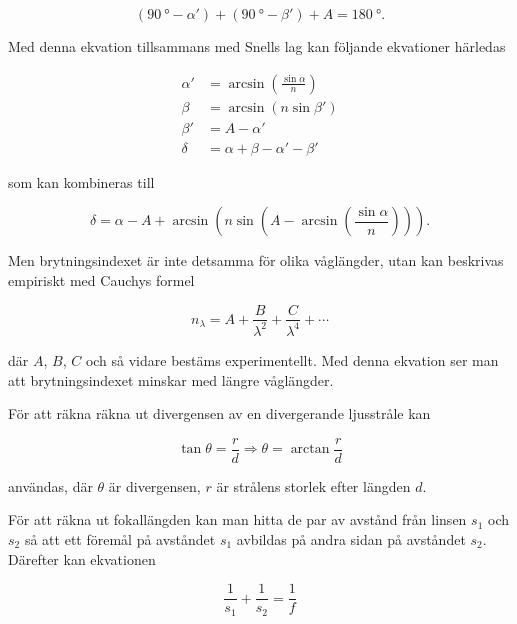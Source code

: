 \documentclass[a4paper]{article}
\begin{document}
  \begin{equation} \label{eq:triSum}
  	(\SI{90}{\degree} - \alpha') + (\SI{90}{\degree} - \beta') + A = \SI{180}{\degree}\text{.}
  \end{equation}
  
  Med denna ekvation tillsammans med Snells lag kan följande ekvationer härledas

  \begin{align} 
  \label{eq:alphaPrim}
  \alpha' &= \arcsin\left(\frac{\sin\alpha}{n}\right)\\
  \label{eq:beta}
  \beta &= \arcsin\left(n \sin\beta'\right)\\
  \label{eq:betaPrim}
  \beta' &= A-\alpha'\\
  \label{eq:delta}
  \delta &= \alpha+\beta-\alpha'-\beta'
  \end{align}
  
  som kan kombineras till

  \begin{equation} \label{eq:avlänkning}
  	\delta = \alpha-A+\arcsin\left(n \sin\left(A-\arcsin\left(\frac{\sin\alpha}{n}\right)\right)\right)\text{.}
  \end{equation}
  
  Men brytningsindexet är inte detsamma för olika våglängder, utan kan beskrivas empiriskt med Cauchys formel
  
  \begin{equation} \label{eq:cauchy}
  	n_\lambda = A + \frac{B}{\lambda^2} + \frac{C}{\lambda^4} + \cdots
  \end{equation}
  
  där $A$, $B$, $C$ och så vidare bestäms experimentellt. Med denna ekvation ser man att brytningsindexet minskar med längre våglängder.
  
  För att räkna räkna ut divergensen av en divergerande ljusstråle kan
  
  \begin{equation}
	\tan\theta = \frac{r}{d} \Rightarrow \theta = \arctan\frac{r}{d}\label{eq:divergensGeom}
  \end{equation}
  
  användas, där $\theta$ är divergensen, $r$ är strålens storlek efter längden $d$.
  
  För att räkna ut fokallängden kan man hitta de par av avstånd från linsen $s_1$ och $s_2$ så att ett föremål på avståndet $s_1$ avbildas på andra sidan på avståndet $s_2$. Därefter kan ekvationen
  
  \begin{equation}
	  \frac{1}{s_1} + \frac{1}{s_2} = \frac{1}{f}
  \end{equation}
  
\end{document}
